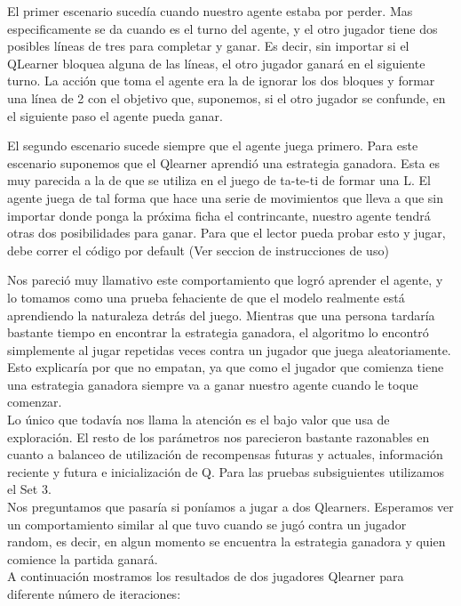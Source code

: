 El primer escenario sucedía cuando nuestro agente estaba por perder. Mas especificamente se da cuando es el turno del agente, y el otro jugador tiene dos posibles líneas de tres para completar y ganar.
Es decir, sin importar si el QLearner bloquea alguna de las líneas, el otro jugador ganará en el siguiente turno. La acción que toma el agente era la de ignorar los dos bloques y formar una línea de 2 con el objetivo que, suponemos, si el otro jugador se confunde, en el siguiente paso el agente pueda ganar.

El segundo escenario sucede siempre que el agente juega primero. Para este escenario suponemos que el Qlearner aprendió una estrategia ganadora. Esta es muy parecida a la de que se utiliza en el juego de ta-te-ti de formar una L. El agente juega de tal forma que hace una serie de movimientos que lleva a que sin importar donde ponga la próxima ficha el contrincante, nuestro agente tendrá otras dos posibilidades para ganar.
Para que el lector pueda probar esto y jugar, debe correr el código por default (Ver seccion de instrucciones de uso)

Nos pareció muy llamativo este comportamiento que logró aprender el agente, y lo tomamos como una prueba fehaciente de que el modelo realmente está aprendiendo la naturaleza detrás del juego. Mientras que una persona tardaría bastante tiempo en encontrar la estrategia ganadora, el algoritmo lo encontró simplemente al jugar repetidas veces contra un jugador que juega aleatoriamente.
Esto explicaría por que no empatan, ya que como el jugador que comienza tiene una estrategia ganadora siempre va a ganar nuestro agente cuando le toque comenzar.\\

Lo único que todavía nos llama la atención es el bajo valor que usa de exploración. El resto de los parámetros nos parecieron bastante razonables en cuanto a balanceo de utilización de recompensas futuras y actuales, información reciente y futura e inicialización de Q.
Para las pruebas subsiguientes utilizamos el Set 3.\\

Nos preguntamos que pasaría si poníamos a jugar a dos Qlearners. Esperamos ver un comportamiento similar al que tuvo cuando se jugó contra un jugador random, es decir, en algun momento se encuentra la estrategia ganadora y quien comience la partida ganará.\\

A continuación mostramos los resultados de dos jugadores Qlearner para diferente número de iteraciones:


